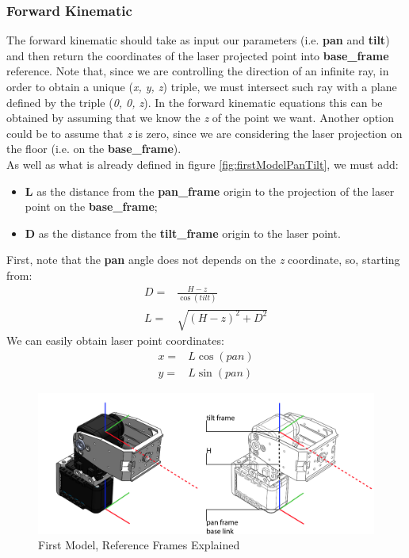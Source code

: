 \subsubsection{Forward Kinematic}
The forward kinematic should take as input our parameters (i.e. \textbf{pan} and \textbf{tilt}) and then return the coordinates of the laser projected point into \textbf{base\_frame} reference. 
Note that, since we are controlling the direction of an infinite ray, in order to obtain a unique (\textit{x, y, z}) triple, we must intersect such ray with a plane defined by the triple (\textit{0, 0, z}). In the forward kinematic equations this can be obtained by assuming that we know the \textit{z} of the point we want. Another option could be to assume that \textit{z} is zero, since we are considering the laser projection on the floor (i.e. on the \textbf{base\_frame}). \\
As well as what is already defined in figure \ref{fig:firstModelPanTilt}, we must add:
\begin{itemize}
    \item \textbf{L} as the distance from the \textbf{pan\_frame} origin to the projection of the laser point on the \textbf{base\_frame};
    \item \textbf{D} as the distance from the \textbf{tilt\_frame} origin to the laser point.
\end{itemize}
First, note that the \textbf{pan} angle does not depends on the \textit{z} coordinate, so, starting from:
\begin{align}
	D=& \frac{H-z}{\cos{(tilt)}} \label{eq:d}\\
	L=& \sqrt{(H-z)^2 + D^2}
\end{align}
We can easily obtain laser point coordinates:
\begin{align}
	x=& L\cos{(pan)}\label{eq:x}\\
	y=& L\sin{(pan)} \label{eq:y}
\end{align}

\begin{figure}
	\centering
	\includegraphics[width=\textwidth]{img/model1Ref.png}%
	\caption{First Model, Reference Frames Explained}
	\label{fig:firstModelRefFrame}
\end{figure}

